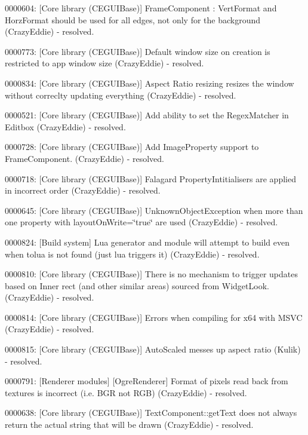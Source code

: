 \begin{DoxyItemize}
\item 0000604\+: \mbox{[}Core library (C\+E\+G\+U\+I\+Base)\mbox{]} Frame\+Component \+: Vert\+Format and Horz\+Format should be used for all edges, not only for the background (Crazy\+Eddie) -\/ resolved.
\item 0000773\+: \mbox{[}Core library (C\+E\+G\+U\+I\+Base)\mbox{]} Default window size on creation is restricted to app window size (Crazy\+Eddie) -\/ resolved.
\item 0000834\+: \mbox{[}Core library (C\+E\+G\+U\+I\+Base)\mbox{]} Aspect Ratio resizing resizes the window without correclty updating everything (Crazy\+Eddie) -\/ resolved.
\item 0000521\+: \mbox{[}Core library (C\+E\+G\+U\+I\+Base)\mbox{]} Add ability to set the Regex\+Matcher in Editbox (Crazy\+Eddie) -\/ resolved.
\item 0000728\+: \mbox{[}Core library (C\+E\+G\+U\+I\+Base)\mbox{]} Add Image\+Property support to Frame\+Component. (Crazy\+Eddie) -\/ resolved.
\item 0000718\+: \mbox{[}Core library (C\+E\+G\+U\+I\+Base)\mbox{]} Falagard Property\+Intitialisers are applied in incorrect order (Crazy\+Eddie) -\/ resolved.
\item 0000645\+: \mbox{[}Core library (C\+E\+G\+U\+I\+Base)\mbox{]} Unknown\+Object\+Exception when more than one property with layout\+On\+Write=\char`\"{}true\char`\"{} are used (Crazy\+Eddie) -\/ resolved.
\item 0000824\+: \mbox{[}Build system\mbox{]} Lua generator and module will attempt to build even when tolua is not found (just lua triggers it) (Crazy\+Eddie) -\/ resolved.
\item 0000810\+: \mbox{[}Core library (C\+E\+G\+U\+I\+Base)\mbox{]} There is no mechanism to trigger updates based on Inner rect (and other similar areas) sourced from Widget\+Look. (Crazy\+Eddie) -\/ resolved.
\item 0000814\+: \mbox{[}Core library (C\+E\+G\+U\+I\+Base)\mbox{]} Errors when compiling for x64 with M\+S\+VC (Crazy\+Eddie) -\/ resolved.
\item 0000815\+: \mbox{[}Core library (C\+E\+G\+U\+I\+Base)\mbox{]} Auto\+Scaled messes up aspect ratio (Kulik) -\/ resolved.
\item 0000791\+: \mbox{[}Renderer modules\mbox{]} \mbox{[}Ogre\+Renderer\mbox{]} Format of pixels read back from textures is incorrect (i.\+e. B\+GR not R\+GB) (Crazy\+Eddie) -\/ resolved.
\item 0000638\+: \mbox{[}Core library (C\+E\+G\+U\+I\+Base)\mbox{]} Text\+Component\+::get\+Text does not always return the actual string that will be drawn (Crazy\+Eddie) -\/ resolved.

\end{DoxyItemize}
